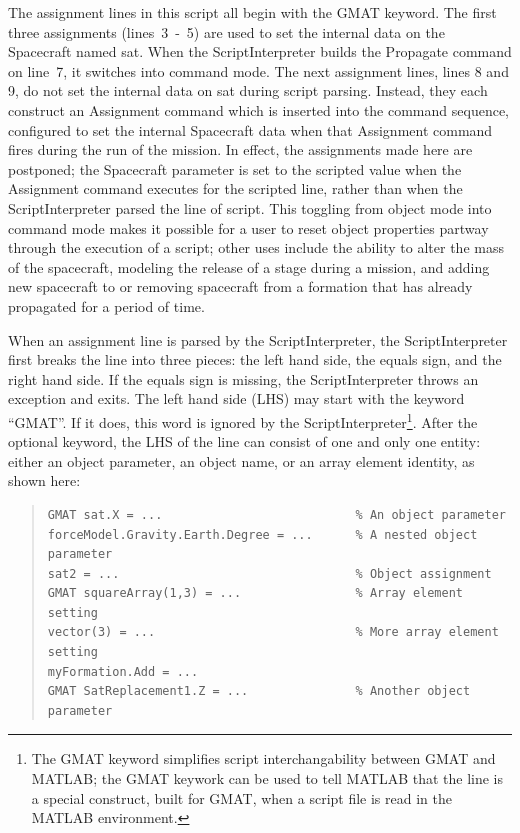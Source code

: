 \noindent The assignment lines in this script all begin with the GMAT keyword.  The first three
assignments (lines~3~-~5) are used to set the internal data on the Spacecraft named sat.  When the
ScriptInterpreter builds the Propagate command on line~7, it switches into command mode.  The next
assignment lines, lines 8 and 9, do not set the internal data on sat during script parsing.
Instead, they each construct an Assignment command which is inserted into the command sequence,
configured to set the internal Spacecraft data when that Assignment command fires during the run of
the mission. In effect, the assignments made here are postponed; the Spacecraft parameter is set to
the scripted value when the Assignment command executes for the scripted line, rather than when the
ScriptInterpreter parsed the line of script.  This toggling from object mode into command mode makes
it possible for a user to reset object properties partway through the execution of a script; other
uses include the ability to alter the mass of the spacecraft, modeling the release of a stage during
a mission, and adding new spacecraft to or removing spacecraft from a formation that has already
propagated for a period of time.

When an assignment line is parsed by the ScriptInterpreter, the ScriptInterpreter first breaks the
line into three pieces: the left hand side, the equals sign, and the right hand side.  If the
equals sign is missing, the ScriptInterpreter throws an exception and exits.  The left hand side
(LHS) may start with the keyword ``GMAT''. If it does, this word is ignored by the
ScriptInterpreter\footnote{The GMAT keyword simplifies script interchangability between GMAT and
MATLAB; the GMAT keywork can be used to tell MATLAB that the line is a special construct, built for
GMAT, when a script file is read in the MATLAB environment.}.  After the optional keyword, the LHS
of the line can consist of one and only one entity: either an object parameter, an object name, or
an array element identity, as shown here:

\begin{quote}
\linenumbers[1]
\begin{verbatim}
GMAT sat.X = ...                           % An object parameter
forceModel.Gravity.Earth.Degree = ...      % A nested object parameter
sat2 = ...                                 % Object assignment
GMAT squareArray(1,3) = ...                % Array element setting
vector(3) = ...                            % More array element setting
myFormation.Add = ...
GMAT SatReplacement1.Z = ...               % Another object parameter
\end{verbatim}
\nolinenumbers
\end{quote}

